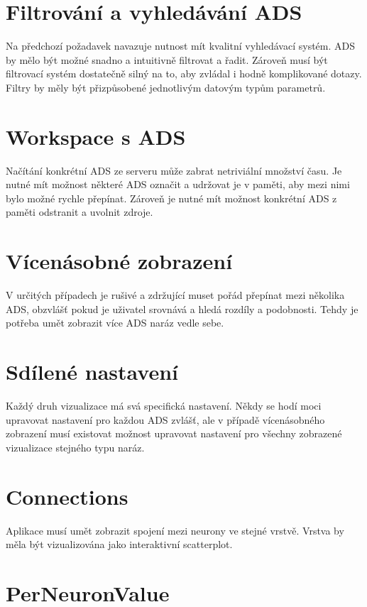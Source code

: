 \section{Filtrování a vyhledávání ADS}

Na předchozí požadavek navazuje nutnost mít kvalitní vyhledávací systém. ADS by mělo být možné snadno a intuitivně filtrovat a řadit. Zároveň musí být filtrovací systém dostatečně silný na to, aby zvládal i hodně komplikované dotazy. Filtry by měly být přizpůsobené jednotlivým datovým typům parametrů.

\section{Workspace s ADS}

Načítání konkrétní ADS ze serveru může zabrat netriviální množství času. Je nutné mít možnost některé ADS označit a udržovat je v paměti, aby mezi nimi bylo možné rychle přepínat. Zároveň je nutné mít možnost konkrétní ADS z paměti odstranit a uvolnit zdroje.

\section{Vícenásobné zobrazení}

V určitých případech je rušivé a zdržující muset pořád přepínat mezi několika ADS, obzvlášť pokud je uživatel srovnává a hledá rozdíly a podobnosti. Tehdy je potřeba umět zobrazit více ADS naráz vedle sebe.

\section{Sdílené nastavení}

Každý druh vizualizace má svá specifická nastavení. Někdy se hodí moci upravovat nastavení pro každou ADS zvlášť, ale v případě vícenásobného zobrazení musí existovat možnost upravovat nastavení pro všechny zobrazené vizualizace stejného typu naráz.

\section{Connections}

Aplikace musí umět zobrazit spojení mezi neurony ve stejné vrstvě. Vrstva by měla být vizualizována jako interaktivní scatterplot.

\section{PerNeuronValue}

